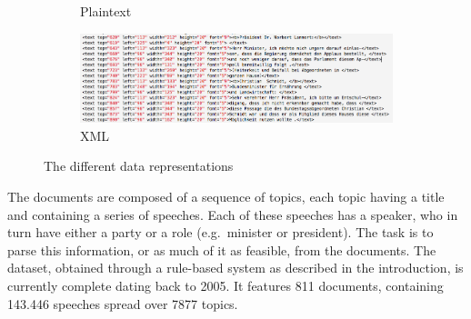 \begin{figure}[htbp]
\begin{subfigure}[b]{0.59\textwidth}
    \caption{Plaintext}
    \vspace{2ex}
    \includegraphics[width=\textwidth]{figures/xml.png}
    \caption{XML}
  \end{subfigure}
  \caption{The different data representations}
  \label{fig:example}
\end{figure}

The documents are composed of a sequence of topics, each topic having a title
and containing a series of speeches. Each of these speeches has a speaker, who
in turn have either a party or a role (e.g.\ minister or president). The task is
to parse this information, or as much of it as feasible, from the documents.
The dataset, obtained through a rule-based system as described in the
introduction, is currently complete dating back to 2005. It features 811
documents, containing 143.446 speeches spread over 7877 topics.

